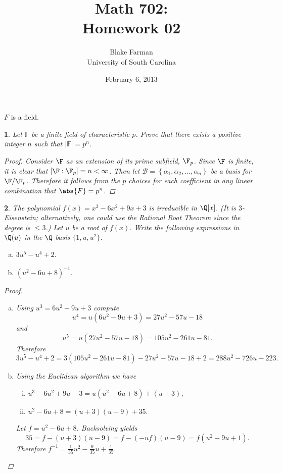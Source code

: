 \documentclass[10pt]{amsart}
\author{Blake Farman\\University of South Carolina}
\title{Math 702:\\Homework 02}
\date{February 6, 2013}
\begin{document}
\maketitle

\providecommand{\p}{\mathfrak{p}}
\providecommand{\m}{\mathfrak{m}}

\newtheorem{thm}{}
\newtheorem{lem}{Lemma}

\newcommand{\End}[2]{\operatorname{End}_{#1}\left(#2\right)}
\newcommand{\Hom}[2]{\operatorname{Hom}_{#1}\left(#2\right)}

$F$ is a field.
\begin{thm}\label{Ex1}
  Let $\mathbb{F}$ be a finite field of characteristic $p$.  Prove that there exists a positive integer $n$
  such that  $|\mathbb{F}| = p^n$.
  \begin{proof}
    Consider $\F$ as an extension of its prime subfield, $\F_p$.
    Since $\F$ is finite, it is clear that $[\F:\F_p] = n < \infty$.
    Then let $\mathcal{B} = \left\{\alpha_1, \alpha_2, \ldots, \alpha_n\right\}$ be a basis for $\F/\F_p$.
    Therefore it follows from the $p$ choices for each coefficient in any linear combination that $\abs{F} = p^n$.
  \end{proof}
\end{thm}

\begin{thm}
  The polynomial $f(x) = x^3 - 6x^2 + 9x + 3$ is irreducible in $\Q[x]$.  (It is $3$-Eisenstein; alternatively, one 
  could use the Rational Root Theorem since the degree is $\leq 3$.)  Let $u$ be a root of $f(x)$.
  Write the following expressions in $\Q(u)$ in the $\Q$-basis $\{1, u, u^2\}$.
  \begin{enumerate}[(a)]
  \item
    $3u^5 - u^4 + 2$.
  \item
    $(u^2 - 6u + 8)^{-1}$.
  \end{enumerate}

  \begin{proof}
    \begin{enumerate}[(a)]
    \item
      Using $u^3 = 6u^2 - 9u + 3$ compute 
      $$u^4 = u(6u^2 - 9u + 3) = 27u^2 - 57u - 18$$ 
      and
      $$u^5 = u(27u^2 - 57u - 18) = 105u^2 - 261u - 81.$$
      Therefore 
      $$3u^5 - u^4 + 2 = 3(105u^2 - 261u - 81) - 27u^2 - 57u - 18 + 2 = 288u^2 - 726u - 223.$$
    \item
      Using the Euclidean algorithm we have
      \begin{enumerate}[(i)]
      \item
        $u^3 - 6u^2 + 9u - 3 = u(u^2 - 6u + 8) + (u + 3)$,
      \item
        $u^2 - 6u + 8 = (u+3)(u-9) + 35.$
      \end{enumerate}
      Let $f = u^2 - 6u + 8$.
      Backsolving yields $$35 = f - (u + 3)(u - 9) = f - (-uf)(u - 9)= f(u^2 - 9u + 1).$$
      Therefore $f^{-1} = \frac{1}{35}u^2 - \frac{9}{35}u + \frac{1}{35}.$
    \end{enumerate}
  \end{proof}
\end{thm}
\end{document}
